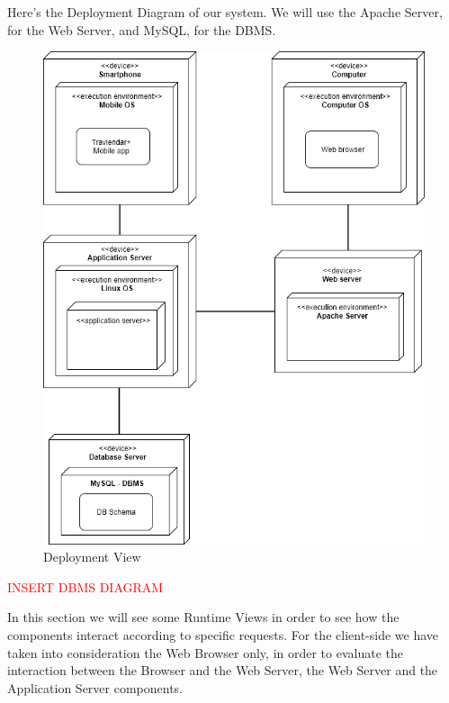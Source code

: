 Here's the Deployment Diagram of our system. We will use the Apache Server, for the Web Server, and MySQL, for the DBMS.
\begin{figure}[H]
	\centering
	\includegraphics[scale=0.3]{Images/Architecture/Deployment_View}
	\caption{Deployment View}
\end{figure}


\textcolor{red}{\Huge INSERT DBMS DIAGRAM}

In this section we will see some Runtime Views in order to see how the components interact according to specific requests.
For the client-side we have taken into consideration the Web Browser only, in order to evaluate the interaction between the Browser and the Web Server, the Web Server and the Application Server components.

